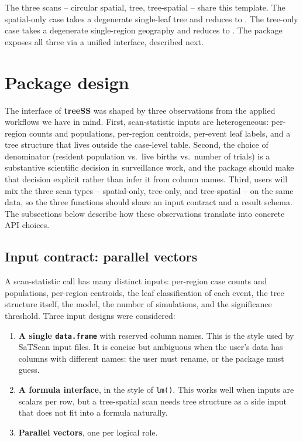 The three scans -- circular spatial, tree, tree-spatial -- share this
template. The spatial-only case takes a degenerate single-leaf tree and
reduces to \citet{kulldorff1997}. The tree-only case takes a degenerate
single-region geography and reduces to \citet{kulldorff2003}. The package exposes
all three via a unified interface, described next.

\hypertarget{sec-design}{%
\section{Package design}\label{sec-design}}

The interface of \textbf{treeSS} was shaped by three observations from the
applied workflows we have in mind. First, scan-statistic inputs are
heterogeneous: per-region counts and populations, per-region centroids,
per-event leaf labels, and a tree structure that lives outside the
case-level table. Second, the choice of denominator (resident population
vs.~live births vs.~number of trials) is a substantive scientific decision
in surveillance work, and the package should make that decision explicit
rather than infer it from column names. Third, users will mix the three
scan types -- spatial-only, tree-only, and tree-spatial -- on the same
data, so the three functions should share an input contract and a result
schema. The subsections below describe how these observations translate
into concrete API choices.

\hypertarget{input-contract-parallel-vectors}{%
\subsection{Input contract: parallel vectors}\label{input-contract-parallel-vectors}}

A scan-statistic call has many distinct inputs: per-region case counts and
populations, per-region centroids, the leaf classification of each event,
the tree structure itself, the model, the number of simulations, and the
significance threshold. Three input designs were considered:

\begin{enumerate}
\def\labelenumi{\arabic{enumi}.}
\tightlist
\item
  \textbf{A single \texttt{data.frame}} with reserved column names. This is the style
  used by SaTScan input files. It is concise but ambiguous when the user's
  data has columns with different names: the user must rename, or the
  package must guess.
\item
  \textbf{A formula interface}, in the style of \texttt{lm()}. This works well when
  inputs are scalars per row, but a tree-spatial scan needs tree
  structure as a side input that does not fit into a formula naturally.
\item
  \textbf{Parallel vectors}, one per logical role.
\end{enumerate}


